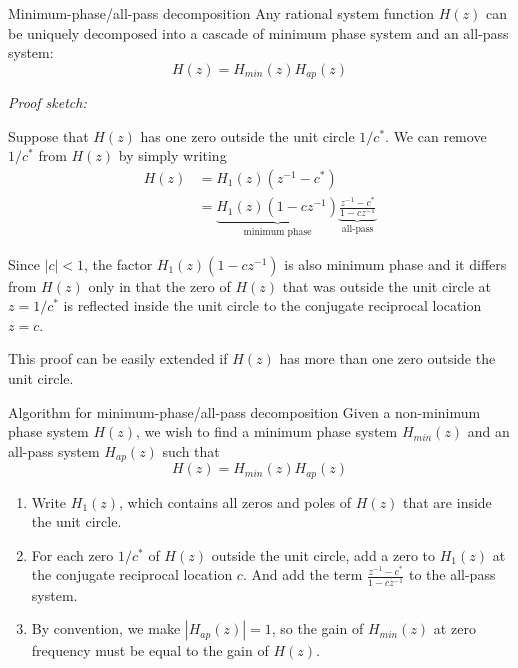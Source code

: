 \documentclass[10pt, aspectratio=169]{beamer}
\begin{document}
%
\begin{frame}{Minimum-phase/all-pass decomposition}
	Any rational system function $H(z)$ can be uniquely decomposed into a cascade of minimum phase system and an all-pass system:
	\begin{equation*}
	H(z) = H_{min}(z)H_{ap}(z)
	\end{equation*}
	
\textit{Proof sketch:}

Suppose that $H(z)$ has one zero outside the unit circle $1/c^*$. We can remove $1/c^*$ from $H(z)$ by simply writing
\begin{align*}
H(z) &= H_1(z)(z^{-1} - c^*) \\
&= \underbrace{H_1(z)(1 - cz^{-1})}_{\text{minimum phase}}\underbrace{\frac{z^{-1} - c^*}{1 - cz^{-1}}}_{\text{all-pass}}
\end{align*}

Since $|c| < 1$, the factor $H_1(z)(1 - cz^{-1})$ is also minimum phase and it differs from $H(z)$ only in that the zero of $H(z)$ that was outside the unit circle at $z = 1/c^*$ is reflected inside the unit circle to the conjugate reciprocal location $z = c$. 

This proof can be easily extended if $H(z)$ has more than one zero outside the unit circle.
	
\end{frame}

%
\begin{frame}{Algorithm for minimum-phase/all-pass decomposition}
Given a non-minimum phase system $H(z)$, we wish to find a minimum phase system $H_{min}(z)$ and an all-pass system $H_{ap}(z)$ such that
\begin{equation*}
H(z) = H_{min}(z)H_{ap}(z)
\end{equation*}
\begin{enumerate}
	\item Write $H_1(z)$, which contains all zeros and poles of $H(z)$ that are inside the unit circle.
	\item For each zero $1/c^*$ of $H(z)$ outside the unit circle, add a zero to $H_1(z)$ at the conjugate reciprocal location $c$. And add the term $\frac{z^{-1} - c^*}{1 - cz^{-1}}$ to the all-pass system.
	\item By convention, we make $|H_{ap}(z)| = 1$, so the gain of $H_{min}(z)$ at zero frequency must be equal to the gain of $H(z)$.
\end{enumerate}
\end{frame}
\end{document}

